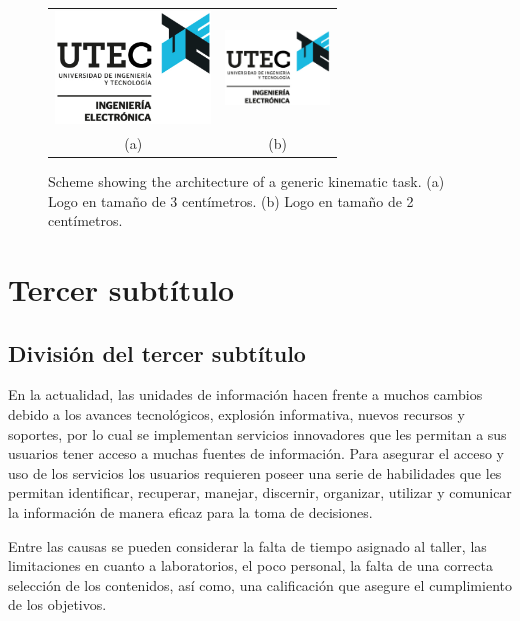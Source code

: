 \begin{figure} 
\begin{center}
\begin{tabular}{cc}
\includegraphics[height=3cm]{./images/ELECTRONICA} &
\includegraphics[height=2cm]{./images/ELECTRONICA} \\
(a) & (b)
\end{tabular}
\caption{\label{fig:diagram2}Scheme showing the architecture of a generic kinematic task. (a) Logo en tamaño de 3 centímetros. (b) Logo en tamaño de 2 centímetros.}
\end{center}
\end{figure}


\section{Tercer subtítulo}

\subsection{División del tercer subtítulo}

En la actualidad, las unidades de información hacen frente a muchos cambios
debido a los avances tecnológicos, explosión informativa, nuevos recursos y
soportes, por lo cual se implementan servicios innovadores que les permitan a
sus usuarios tener acceso a muchas fuentes de información. Para asegurar el
acceso y uso de los servicios los usuarios requieren poseer una serie de
habilidades que les permitan identificar, recuperar, manejar, discernir,
organizar, utilizar y comunicar la información de manera eficaz para la toma de
decisiones.

Entre las causas se pueden considerar la falta de tiempo asignado al taller,
las limitaciones en cuanto a laboratorios, el poco personal, la falta de una
correcta selección de los contenidos, así como, una calificación que asegure el
cumplimiento de los objetivos.


